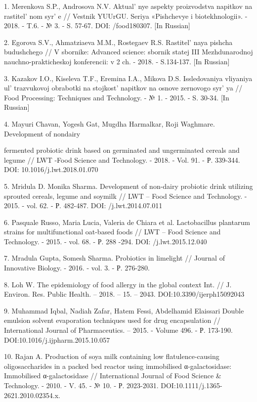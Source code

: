 \begin{references}
1. Merenkova S.P., Androsova N.V. Aktual' nye aspekty
proizvodstva napitkov na rastitel' nom
syr' e // Vestnik YUUrGU. Seriya «Pishchevye i
biotekhnologii». - 2018. - T.6. - № 3. - S. 57-67. DOI:
/food180307. {[}In Russian{]}

2. Egorova S.V., Ahmatziaeva M.M., Rostegaev R.S.
Rastitel' naya pishcha budushchego // V sbornike:
Advanced science: sbornik statej III Mezhdunarodnoj
nauchno-prakticheskoj konferencii: v 2 ch. - 2018. - S.134-137. {[}In
Russian{]}

3. Kazakov I.O., Kiseleva T.F., Eremina I.A., Mikova D.S. Issledovaniya
vliyaniya ul' trazvukovoj obrabotki na
stojkost'{} napitkov na osnove zernovogo
syr' ya // Food Processing: Techniques and Technology. -
№ 1. - 2015. - S. 30-34. {[}In Russian{]}

4. Mayuri Chavan, Yogesh Gat, Mugdha Harmalkar, Roji Waghmare.
Development of nondairy

fermented probiotic drink based on germinated and ungerminated cereals
and legume // LWT -Food Science and Technology. - 2018. - Vol. 91. - Р.
339-344. DOI: 10.1016/j.lwt.2018.01.070

5. Mridula D. Monika Sharma. Development of non-dairy probiotic drink
utilizing sprouted cereals, legume and soymilk // LWT -- Food Science
and Technology. - 2015. - vol. 62. - Р. 482-487. DOI:
/j.lwt.2014.07.011

6. Pasquale Russo, Maria Lucia, Valeria de Chiara et al. Lactobacillus
plantarum strains for multifunctional oat-based foods // LWT -- Food
Science and Technology. - 2015. - vol. 68. - Р. 288 -294. DOI:
/j.lwt.2015.12.040

7. Mradula Gupta, Somesh Sharma. Probiotics in limelight // Journal of
Innovative Biology. - 2016. - vol. 3. - Р. 276-280.

8. Loh W. The epidemiology of food allergy in the global context Int. //
J. Environ. Res. Public Health. -- 2018. -- 15. -- 2043.
DOI:10.3390/ijerph15092043

9. Muhammad Iqbal, Nadiah Zafar, Hatem Fessi, Abdelhamid Elaissari
Double emulsion solvent evaporation techniques used for drug
encapsulation // International Journal of Pharmaceutics. -- 2015. -
Volume 496. - Р. 173-190. DOI:10.1016/j.ijpharm.2015.10.057

10. Rajan A. Production of soya milk containing low flatulence-causing
oligosaccharides in a packed bed reactor using immobilised
α-galactosidase: Immobilised α-galactosidase // International Journal of
Food Science \& Technology. - 2010. - V. 45. - № 10. - Р. 2023-2031.
DOI:10.1111/j.1365- 2621.2010.02354.x.
\end{references}

